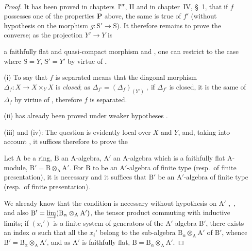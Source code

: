 \begin{proof}
It has been proved in chapters~I\textsuperscript{er}, II and in chapter~IV, \S~1, that if $f$ possesses
one of the properties $\mathbf{P}$ above, the same is true of $f'$ (without hypothesis on the morphism
$g:\mathrm{S}'\to\mathrm{S}$). It therefore remains to prove the converse; as the projection $Y'\to Y$ is


a faithfully flat and quasi-compact morphism  and , one can restrict to
the case where $\mathrm{S}=Y$, $\mathrm{S}'=Y'$ by virtue of .

(i) To say that $f$ is separated means that the diagonal morphism $\Delta_f:X\to X\times_Y X$ is
\emph{closed}; as $\Delta_{f'}=(\Delta_f)_{(Y')}$ , if $\Delta_{f'}$ is closed, it is the same of $\Delta_f$ by virtue
of , therefore $f$ is separated.

(ii) has already been proved under weaker hypotheses .

(iii) and (iv): The question is evidently local over $X$ and $Y$, and, taking into account
, it suffices therefore to prove the

\begin{lemma}[2.7.1.1]
\label{IV.2.7.1.1}
Let $\mathrm{A}$ be a ring, $\mathrm{B}$ an $\mathrm{A}$-algebra, $\mathrm{A}'$ an $\mathrm{A}$-algebra which is
a faithfully flat $\mathrm{A}$-module, $\mathrm{B}'=\mathrm{B}\otimes_{\mathrm{A}}\mathrm{A}'$. For $\mathrm{B}$ to be an $\mathrm{A}'$-algebra of finite type \textnormal{(}resp.\ of finite
presentation\textnormal{)}, it is necessary and it suffices that $\mathrm{B}'$ be an $\mathrm{A}'$-algebra of finite type \textnormal{(}resp.\ of finite
presentation\textnormal{)}.
\end{lemma}

We already know that the condition is necessary without hypothesis on $\mathrm{A}'$ ,~,
 and also $\mathrm{B}'=\varinjlim(\mathrm{B}_\alpha\otimes_{\mathrm{A}}\mathrm{A}')$, the tensor product commuting with inductive
limits; if $(x_i')$ is a finite system of generators of the $\mathrm{A}'$-algebra $\mathrm{B}'$, there exists an index $\alpha$
such that all the $x_i'$ belong to the sub-algebra $\mathrm{B}_\alpha\otimes_{\mathrm{A}}\mathrm{A}'$ of $\mathrm{B}'$, whence $\mathrm{B}'=\mathrm{B}_\alpha\otimes_{\mathrm{A}}\mathrm{A}'$,
and as $\mathrm{A}'$ is faithfully flat, $\mathrm{B}=\mathrm{B}_\alpha\otimes_{\mathrm{A}}\mathrm{A}'$.


\end{proof}

